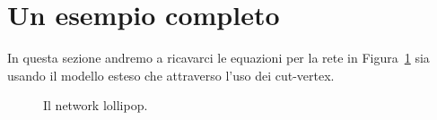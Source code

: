 \section{Un esempio completo}
In questa sezione andremo  a ricavarci le equazioni per la rete in Figura~\ref{fig::lollipop} sia usando il modello esteso che attraverso l'uso dei cut-vertex.
\begin{figure}[!ht]
\centering
{}

\caption[Lollipop ]{Il network lollipop.}
\label{fig::lollipop}
\end{figure}
